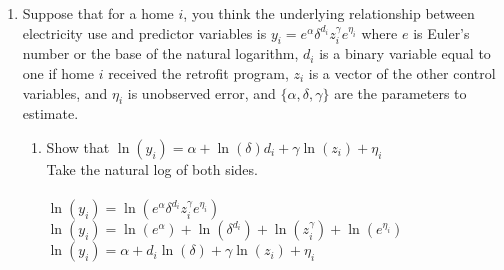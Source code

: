 \documentclass[letterpaper,10pt]{article}
\begin{document}
\begin{enumerate}
\item Suppose that for a home $i$, you think the underlying relationship between electricity use and predictor variables is $y_i=e^\alpha\delta^{d_i}z_i^{\gamma}e^{\eta_i}$ where $e$ is Euler's number or the base of the natural logarithm, $d_i$ is a binary variable equal to one if home $i$ received the retrofit program, $z_i$ is a vector of the other control variables, and $\eta_i$ is unobserved error, and $\{\alpha,\delta,\gamma\}$ are the parameters to estimate.

\begin{enumerate}
    \item Show that $\ln(y_i)=\alpha+\ln(\delta)d_i+\gamma\ln(z_i)+\eta_i$\\
    Take the natural log of both sides.\\
    \\
        $\ln(y_i)=\ln(e^\alpha\delta^{d_i}z_i^{\gamma}e^{\eta_i})$\\
        $\ln(y_i)=\ln(e^\alpha)+\ln(\delta^{d_i})+\ln(z_i^{\gamma})+\ln(e^{\eta_i})$\\
        $\ln(y_i)=\alpha+d_i\ln(\delta)+\gamma\ln(z_i)+\eta_i$\\
    

\end{enumerate}
\end{enumerate}
\end{document}
